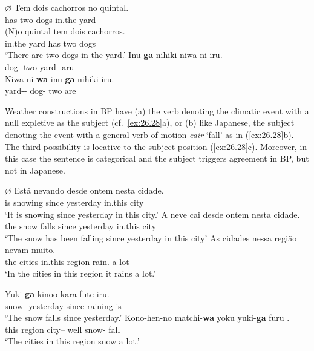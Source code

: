 \documentclass[output=paper]{langsci/langscibook}
\begin{document}
\ea%
    \label{ex:26.26}
    \ea
    \gll \textbf{$\varnothing$} Tem dois cachorros no quintal.\\
        has two dogs in.the yard\\
    \ex
    \gll (N)o quintal  tem dois cachorros.\\
        in.the yard has two dogs\\
    \glt \enquote*{There are two dogs in the yard.}
    \z
\ex%
    \label{ex:26.27}
    \ea
    \gll    Inu-\textbf{ga} nihiki  niwa-ni iru.\\
            dog-\Nom{}  two yard-\Loc{} aru\\
    \ex
    \gll    Niwa-ni-\textbf{wa} inu-\textbf{ga} nihiki iru.\\
            yard-\Loc{}-\Topic{} dog-\Nom{} two are\\
    \z
\z

Weather constructions in \gls{BP} have (a) the verb
denoting the climatic event with a null expletive as the subject  (cf.\
\ref{ex:26.28}a), or  (b) like Japanese, the subject denoting  the event
with a general verb of motion \emph{cair} \enquote*{fall} as in
(\ref{ex:26.28}b).  The third possibility is locative  to the
subject position (\ref{ex:26.28}c).  Moreover, in this case the sentence is
categorical and the subject triggers agreement in \gls{BP}\il{Brazilian
Portuguese}, but not in Japanese.

\ea%
    \label{ex:26.28}
    \ea
	\gll	$\varnothing$ Está nevando  desde ontem nesta cidade.\\
			{} is  snowing    since yesterday in.this city\\
	\glt	\enquote*{It is snowing since yesterday in this city.}
    \ex
	\gll	A neve   cai   desde ontem   nesta cidade.\\
			the snow falls since yesterday in.this city\\
	\glt	\enquote*{The snow has been falling since yesterday in this city}
    \ex
	\gll	As cidades nessa região nevam muito.\\
            the cities    in.this region  rain.\Tpl{} {a lot}\\
	\glt	\enquote*{In the cities in this region it rains a lot.}
    \z
\z

\ea%
    \label{ex:26.29}
    \ea
	\gll	Yuki-\textbf{ga}   kinoo-kara         fute-iru.\\
            snow-\Nom{} yesterday-since  raining-is\\
	\glt	\enquote*{The snow falls since yesterday.}
    \ex
	\gll	Kono-hen-no matchi-\textbf{wa}  yoku yuki-\textbf{ga}      furu .\\
            {this region} city–\Topic{} well snow-\Nom{}  fall\\
	\glt	\enquote*{The cities in this region snow a lot.}
    \z
\z
\end{document}
